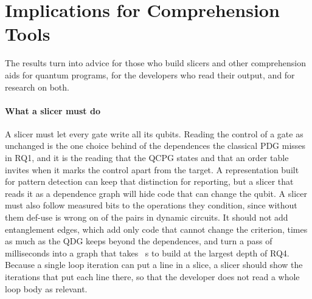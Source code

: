 \section{Implications for Comprehension Tools}\label{sec:implications}

The results turn into advice for those who build slicers and other comprehension aids for quantum programs, for the
developers who read their output, and for research on both.

\paragraph*{What a slicer must do}
A slicer must let every gate write all its qubits. Reading the control of a gate as unchanged is the one choice
behind \numCpdgMissControlPct{} of the dependences the classical PDG misses in RQ1, and it is the reading that the QCPG states and that an order table invites
when it marks the control apart from the target. A representation built for pattern detection can keep that
distinction for reporting, but a slicer that reads it as a dependence graph will hide code that can change the
qubit. A slicer must also follow measured bits to the operations they condition, since without them def-use is wrong
on \numDuDynamicUnsound{} of the \numNDynamicPairs{} pairs in dynamic circuits. It should not add entanglement
edges, which add only code that cannot change the criterion, \numYzLcExcessRatio{} times as much as the QDG keeps
beyond the dependences, and turn a pass of milliseconds into a graph that takes \numCostBuildDepthOneSixty{}~s to
build at the largest depth of RQ4. Because a single loop iteration can put a line in a slice, a slicer should show the iterations that put each
line there, so that the developer does not read a whole loop body as relevant.

